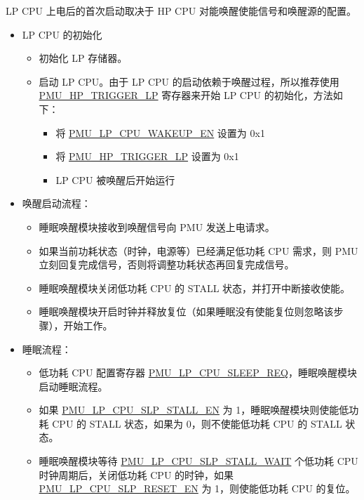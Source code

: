 \documentclass[main\_\_CN.tex]{subfiles}
\begin{document}
LP CPU 上电后的首次启动取决于 HP CPU 对能唤醒使能信号和唤醒源的配置。
\begin{itemize}
    \item LP CPU 的初始化
        \begin{itemize}
            \item 初始化 LP 存储器。
            \item 启动 LP CPU。由于 LP CPU 的启动依赖于唤醒过程，所以推荐使用 \hyperref[fielddesc:PMUHPTRIGGERLP]{PMU\_HP\_TRIGGER\_LP} 寄存器来开始 LP CPU 的初始化，方法如下：
            \begin{itemize}
               \item 将 \hyperref[fielddesc:PMULPCPUWAKEUPEN]{PMU\_LP\_CPU\_WAKEUP\_EN} 设置为 0x1
               \item 将 \hyperref[fielddesc:PMUHPTRIGGERLP]{PMU\_HP\_TRIGGER\_LP} 设置为 0x1
               \item LP CPU 被唤醒后开始运行
            \end{itemize}
        \end{itemize}
    \item 唤醒启动流程：
    \begin{itemize}
     \item 睡眠唤醒模块接收到唤醒信号向 PMU 发送上电请求。
     \item 如果当前功耗状态（时钟，电源等）已经满足低功耗 CPU 需求，则 PMU 立刻回复完成信号，否则将调整功耗状态再回复完成信号。
     \item 睡眠唤醒模块关闭低功耗 CPU 的 STALL 状态，并打开中断接收使能。
     \item 睡眠唤醒模块开启时钟并释放复位（如果睡眠没有使能复位则忽略该步骤），开始工作。
   \end{itemize}

    \item 睡眠流程：
    \begin{itemize}
    \item 低功耗 CPU 配置寄存器 \hyperref[fielddesc:PMULPCPUSLEEPREQ]{PMU\_LP\_CPU\_SLEEP\_REQ}，睡眠唤醒模块启动睡眠流程。
    \item 如果 \hyperref[fielddesc:PMULPCPUSLPSTALLEN]{PMU\_LP\_CPU\_SLP\_STALL\_EN} 为 1，睡眠唤醒模块则使能低功耗 CPU 的 STALL 状态，如果为 0，则不使能低功耗 CPU 的 STALL 状态。
    \item 睡眠唤醒模块等待 \hyperref[fielddesc:PMULPCPUSLPSTALLWAIT]{PMU\_LP\_CPU\_SLP\_STALL\_WAIT} 个低功耗 CPU 时钟周期后，关闭低功耗 CPU 的时钟，如果 \hyperref[fielddesc:PMULPCPUSLPRESETEN]{PMU\_LP\_CPU\_SLP\_RESET\_EN} 为 1，则使能低功耗 CPU 的复位。
   \end{itemize}
   \end{itemize}
\end{document}
